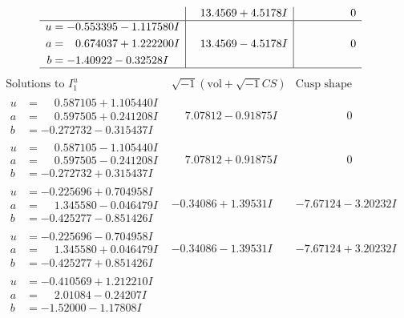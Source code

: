 \documentclass[1p]{elsarticle_modified}
\theoremstyle{definition}
\newcommand{\I}{\sqrt{-1}}
\begin{document}
$$\begin{array}{c|c|c}
 & \phantom{-}13.4569 + 4.5178 I & \phantom{-0.000000 } 0 \\ \hline\begin{aligned}
u &= -0.553395 - 1.117580 I \\
a &= \phantom{-}0.674037 + 1.222200 I \\
b &= -1.40922 - 0.32528 I\end{aligned}
 & \phantom{-}13.4569 - 4.5178 I & \phantom{-0.000000 } 0\\
 \hline 
 \end{array}$$\newpage$$\begin{array}{c|c|c}  
\text{Solutions to }I^u_{1}& \I (\text{vol} + \sqrt{-1}CS) & \text{Cusp shape}\\
 \hline 
\begin{aligned}
u &= \phantom{-}0.587105 + 1.105440 I \\
a &= \phantom{-}0.597505 + 0.241208 I \\
b &= -0.272732 - 0.315437 I\end{aligned}
 & \phantom{-}7.07812 - 0.91875 I & \phantom{-0.000000 } 0 \\ \hline\begin{aligned}
u &= \phantom{-}0.587105 - 1.105440 I \\
a &= \phantom{-}0.597505 - 0.241208 I \\
b &= -0.272732 + 0.315437 I\end{aligned}
 & \phantom{-}7.07812 + 0.91875 I & \phantom{-0.000000 } 0 \\ \hline\begin{aligned}
u &= -0.225696 + 0.704958 I \\
a &= \phantom{-}1.345580 - 0.046479 I \\
b &= -0.425277 - 0.851426 I\end{aligned}
 & -0.34086 + 1.39531 I & -7.67124 - 3.20232 I \\ \hline\begin{aligned}
u &= -0.225696 - 0.704958 I \\
a &= \phantom{-}1.345580 + 0.046479 I \\
b &= -0.425277 + 0.851426 I\end{aligned}
 & -0.34086 - 1.39531 I & -7.67124 + 3.20232 I \\ \hline\begin{aligned}
u &= -0.410569 + 1.212210 I \\
a &= \phantom{-}2.01084 - 0.24207 I \\
b &= -1.52000 - 1.17808 I\end{aligned}

\end{array}$$
\end{document}
